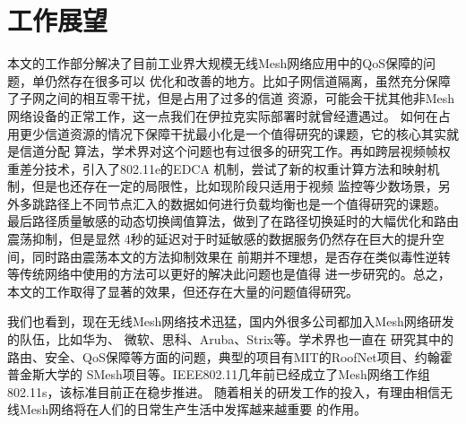 \section{工作展望}
本文的工作部分解决了目前工业界大规模无线Mesh网络应用中的QoS保障的问题，单仍然存在很多可以
优化和改善的地方。比如子网信道隔离，虽然充分保障了子网之间的相互零干扰，但是占用了过多的信道
资源，可能会干扰其他非Mesh网络设备的正常工作，这一点我们在伊拉克实际部署时就曾经遭遇过。
如何在占用更少信道资源的情况下保障干扰最小化是一个值得研究的课题，它的核心其实就是信道分配
算法，学术界对这个问题也有过很多的研究工作。再如跨层视频帧权重差分技术，引入了802.11e的EDCA
机制，尝试了新的权重计算方法和映射机制，但是也还存在一定的局限性，比如现阶段只适用于视频
监控等少数场景，另外多跳路径上不同节点汇入的数据如何进行负载均衡也是一个值得研究的课题。
最后路径质量敏感的动态切换阈值算法，做到了在路径切换延时的大幅优化和路由震荡抑制，但是显然
4秒的延迟对于时延敏感的数据服务仍然存在巨大的提升空间，同时路由震荡本文的方法抑制效果在
前期并不理想，是否存在类似毒性逆转等传统网络中使用的方法可以更好的解决此问题也是值得
进一步研究的。总之，本文的工作取得了显著的效果，但还存在大量的问题值得研究。

我们也看到，现在无线Mesh网络技术迅猛，国内外很多公司都加入Mesh网络研发的队伍，比如华为、
微软、思科、Aruba、Strix等。学术界也一直在
研究其中的路由、安全、QoS保障等方面的问题，典型的项目有MIT的RoofNet项目、约翰霍普金斯大学的
SMesh项目等。IEEE802.11几年前已经成立了Mesh网络工作组802.11s，该标准目前正在稳步推进。
随着相关的研发工作的投入，有理由相信无线Mesh网络将在人们的日常生产生活中发挥越来越重要
的作用。


